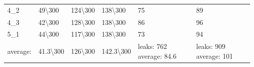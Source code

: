 \begin{table}[]
{\begin{tabular}{@{}llllll@{}}
    4\_2       & {\color[HTML]{D9E1F2} 49\textbackslash{}300} & {\color[HTML]{D9E1F2} 124\textbackslash{}300} & {\color[HTML]{D9E1F2} 138\textbackslash{}300} & {\color[HTML]{D9E1F2} 75}         & {\color[HTML]{D9E1F2} 89}         \\
    4\_3       & {\color[HTML]{D9E1F2} 42\textbackslash{}300} & {\color[HTML]{D9E1F2} 128\textbackslash{}300} & {\color[HTML]{D9E1F2} 138\textbackslash{}300} & {\color[HTML]{D9E1F2} 86}         & {\color[HTML]{D9E1F2} 96}         \\
    5\_1       & {\color[HTML]{D9E1F2} 44\textbackslash{}300} & {\color[HTML]{D9E1F2} 117\textbackslash{}300} & {\color[HTML]{D9E1F2} 138\textbackslash{}300} & {\color[HTML]{D9E1F2} 73}         & {\color[HTML]{D9E1F2} 94}         \\\cmidrule(r){1-6}
    average:   &  {\color[HTML]{FF0000}41.3\textbackslash{}300} &  {\color[HTML]{FF0000}126\textbackslash{}300} & {\color[HTML]{FF0000}142.3\textbackslash{}300}  & {\color[HTML]{FF0000} leaks: 762 average: 84.6} & {\color[HTML]{FF0000} leaks: 909 average: 101} \\\cmidrule(r){1-6}
    \end{tabular}%
    }
    \label{table:ACAS-ANALISY}
    \end{table}

